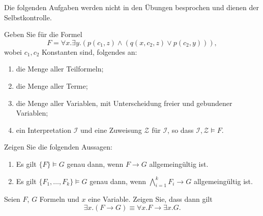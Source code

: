 \documentclass[german]{latteachCD}[2017/03/28]
\begin{document}
\maketitle

\begin{mdframed}
  Die folgenden Aufgaben werden nicht in den Übungen besprochen und dienen der
  Selbstkontrolle.

  \renewcommand{\theexercise}{\Roman{exercise}}
  \setcounter{exercise}{0}

  \begin{exercise}
    Geben Sie für die Formel
    \begin{equation*}
      F = \forall x. \exists y. (p(c_{1},z) \land (q(x,c_{2},z) \lor p(c_{2},y))),
    \end{equation*}
    wobei $c_{1}, c_{2}$ Konstanten sind, folgendes an:
    \begin{enumerate}
    \item die Menge aller Teilformeln;
    \item die Menge aller Terme;
    \item die Menge aller Variablen, mit Unterscheidung freier und gebundener
      Variablen;
    \item ein Interpretation $\mathcal{I}$ und eine Zuweisung $\mathcal{Z}$ für
      $\mathcal{I}$, so dass $\mathcal{I}, \mathcal{Z} \models F$.
    \end{enumerate}
  \end{exercise}

  \begin{exercise}
    Zeigen Sie die folgenden Aussagen:
    \begin{enumerate}
    \item Es gilt $\{F\} \models G$ genau dann, wenn $F \to G$
      allgemeingültig ist.
    \item Es gilt $\{F_{1}, \dots, F_{k}\} \models G$ genau dann, wenn
      $\bigwedge_{i=1}^{k} F_{i} \to G$ allgemeingültig ist.
    \end{enumerate}
  \end{exercise}

  \begin{exercise}
    Seien $F$, $G$ Formeln und $x$ eine Variable.  Zeigen Sie, dass dann gilt
    \begin{equation*}
      \exists x.(F \to G) \equiv \forall x. F \to \exists x. G.
    \end{equation*}
  \end{exercise}
  \vspace*{-1.7\baselineskip}
\end{mdframed}
\end{document}
